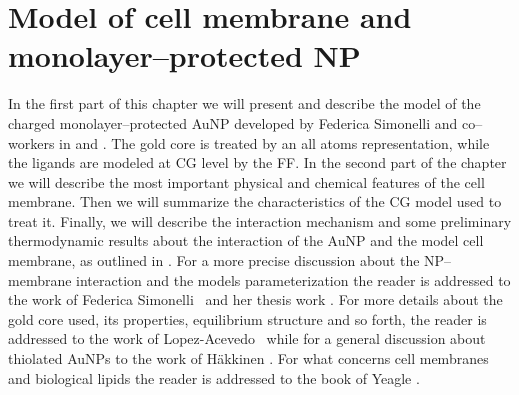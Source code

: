 \chapter{Model of cell membrane and monolayer--protected NP}
\label{chap:tre}
In the first part of this chapter we will present and describe the model of the charged monolayer--protected 
\ac{AuNP} developed by Federica Simonelli and co--workers in \cite{simonelliThesis} and \cite{ourPaper}. The gold 
core is treated by an all atoms representation, while the ligands are modeled at \ac{CG} level by the \martini 
\ac{FF}. In the second part of the chapter we will describe the most important physical and chemical features of 
the cell membrane. Then we will summarize the characteristics of the \ac{CG} model used to treat it. Finally, we 
will describe the interaction mechanism and some preliminary thermodynamic results about the interaction of the 
\ac{AuNP} and the model cell membrane, as outlined in \cite{ourPaper}. For a more precise discussion about the 
\ac{NP}--membrane interaction and the models parameterization the reader is addressed to the work of Federica 
Simonelli \etal\, \cite{ourPaper} and her thesis work \cite{simonelliThesis}. For more details about the gold core used, its properties, equilibrium structure and so forth, the reader is addressed to the work of Lopez-Acevedo \etal\, \cite{clusterEquilibrium} while for a general discussion about thiolated \acp{AuNP} to the work of Häkkinen \cite{corePassivated}. For what concerns cell membranes and biological lipids the reader is addressed to the book of Yeagle \cite{yeagle}.

